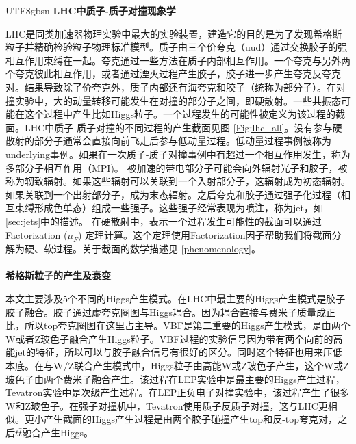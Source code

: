 \begin{CJK}{UTF8}{gbsn}
\textbf{\large{LHC中质子-质子对撞现象学}} %
	\par 	LHC是同类加速器物理实验中最大的实验装置，建造它的目的是为了发现希格斯粒子并精确检验粒子物理标准模型。质子由三个价夸克（uud）通过交换胶子的强相互作用束缚在一起。夸克通过一些方法在质子内部相互作用。一个夸克与另外两个夸克彼此相互作用，或者通过湮灭过程产生胶子，胶子进一步产生夸克反夸克对。结果导致除了价夸克外，质子内部还有海夸克和胶子（统称为部分子）。在对撞实验中，大的动量转移可能发生在对撞的部分子之间，即硬散射。一些共振态可能在这个过程中产生比如Higgs粒子。一个过程发生的可能性被定义为该过程的截面。LHC中质子-质子对撞的不同过程的产生截面见图 \ref{Fig:lhc_all}。没有参与硬散射的部分子通常会直接向前飞走后参与低动量过程。低动量过程事例被称为underlying事例。如果在一次质子-质子对撞事例中有超过一个相互作用发生，称为多部分子相互作用（MPI)。
被加速的带电部分子可能会向外辐射光子和胶子，被称为轫致辐射。如果这些辐射可以关联到一个入射部分子，这辐射成为初态辐射。如果关联到一个出射部分子，成为末态辐射。之后夸克和胶子通过强子化过程（相互束缚形成色单态）组成一些强子。这些强子经常表现为喷注，称为jet，如\ref{sec:jets}中的描述。
在硬散射中，表示一个过程发生可能性的截面可以通过Factorization ($\mu_{F}$) 定理计算。这个定理使用Factorization因子帮助我们将截面分解为硬、软过程。关于截面的数学描述见 \ref{phenomenology}。  \\ \\
\textbf{\large{希格斯粒子的产生及衰变}} %
\par 	本文主要涉及5个不同的Higgs产生模式。在LHC中最主要的Higgs产生模式是胶子-胶子融合。胶子通过虚夸克圈图与Higgs耦合。因为耦合直接与费米子质量成正比，所以top夸克圈图在这里占主导。VBF是第二重要的Higgs产生模式，是由两个W或者Z玻色子融合产生Higgs粒子。VBF过程的实验信号因为带有两个向前的高能jet的特征，所以可以与胶子融合信号有很好的区分。同时这个特征也用来压低本底。在与W/Z联合产生模式中，Higgs粒子由高能W或Z玻色子产生，这个W或Z玻色子由两个费米子融合产生。该过程在LEP实验中是最主要的Higgs产生过程，Tevatron实验中是次级产生过程。在LEP正负电子对撞实验中，该过程产生了很多W和Z玻色子。在强子对撞机中，Tevatron使用质子反质子对撞，这与LHC更相似。更小产生截面的Higgs产生过程是由两个胶子碰撞产生top和反-top夸克对，之后$t\bar{t}$融合产生Higgs。

\end{CJK}
